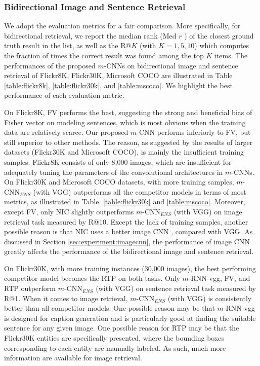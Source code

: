 \documentclass[10pt,twocolumn,letterpaper]{article}
\begin{document}
\label{sec_results}
\subsubsection {Bidirectional Image and Sentence Retrieval}

We adopt the evaluation metrics \cite{karpathy_2014} for a fair comparison. More specifically, for bidirectional retrieval, we report the median rank (Med $r$ ) of the closest ground truth result in the list, as well as the R@$K$ (with $K= 1,5,10$) which computes the fraction of times the correct result was found among the top $K$ items. The performances of the proposed $m$-CNNs on bidirectional image and sentence retrieval of  Flickr8K, Flickr30K, Microsoft COCO are illustrated in Table \ref{table:flickr8k}, \ref{table:flickr30k}, and \ref{table:mscoco}. We highlight the best performance of each evaluation metric.






On Flickr8K, FV performs the best, suggesting the strong and beneficial bias of Fisher vector on modeling sentences, which is most obvious when the training data are relatively scarce. Our proposed $m$-CNN performs inferiorly to FV, but still superior to other methods. The reason, as suggested by the results of larger datasets (Flickr30K and Microsoft COCO), is mainly the insufficient training samples. Flickr8K consists of only 8,000 images, which are insufficient for adequately tuning the parameters of the convolutional architectures in $m$-CNNs. On Flickr30K and Microsoft COCO datasets, with more training samples, $m$-CNN$_{ENS}$ (with VGG) outperforms all the competitor models in terms of most metrics, as illustrated in Table. \ref{table:flickr30k} and \ref{table:mscoco}. Moreover, except FV, only NIC slightly outperforms $m$-CNN$_{ENS}$ (with VGG) on image retrieval task measured by R@10. Except the lack of training samples, another possible reason is that NIC uses a better image CNN \cite{szegedy_arxiv2014}, compared with VGG. As discussed in Section \ref{sec:experiment:imagecnn}, the performance of image CNN greatly affects the performance of the bidirectional image and sentence retrieval.

On Flickr30K, with more training instances (30,000 images), the best performing competitor model becomes the RTP on both tasks. Only $m$-RNN-vgg, FV, and RTP outperform $m$-CNN$_{ENS}$ (with VGG) on sentence retrieval task measured by R@1. When it comes to image retrieval, $m$-CNN$_{ENS}$ (with VGG) is consistently better than all competitor models. One possible reason may be that $m$-RNN-vgg is designed for caption generation and is particularly good at finding the suitable sentence for any given image. One possible reason for RTP may be that the Flickr30K entities are specifically presented, where the bounding boxes corresponding to each entity are manually labeled. As such, much more information are available for image retrieval.
\end{document}
